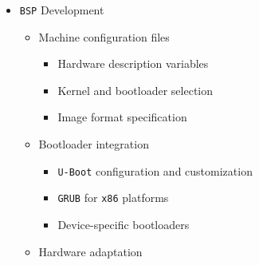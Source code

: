 \documentclass[
]{article}
\providecommand{\tightlist}{%
  \setlength{\itemsep}{0pt}\setlength{\parskip}{0pt}}
\begin{document}
\begin{itemize}
\begin{itemize}
\begin{itemize}
      \begin{itemize}
      \tightlist
      \item
        IMAGE\_FEATURES (debug-tweaks, splash, etc.)
      \item
        DISTRO\_FEATURES (\texttt{systemd}, \texttt{wayland},
        \texttt{x11}, etc.)
      \item
        MACHINE\_FEATURES (\texttt{wifi}, \texttt{bluetooth},
        touchscreen, etc.)
      \item
        Feature dependencies and conflicts
      \end{itemize}
    \item
      Rootfs customization

      \begin{itemize}
      \tightlist
      \item
        Post-processing hooks
      \item
        User and group management
      \item
        Default configuration files
      \item
        \texttt{Systemd} vs SysVinit configuration
      \end{itemize}
    \end{itemize}
  \item
    \texttt{BSP} Development

    \begin{itemize}
    \tightlist
    \item
      Machine configuration files

      \begin{itemize}
      \tightlist
      \item
        Hardware description variables
      \item
        Kernel and bootloader selection
      \item
        Image format specification
      \end{itemize}
    \item
      Bootloader integration

      \begin{itemize}
      \tightlist
      \item
        \texttt{U-Boot} configuration and customization
      \item
        \texttt{GRUB} for \texttt{x86} platforms
      \item
        Device-specific bootloaders
      \end{itemize}
    \item
      Hardware adaptation


\end{itemize}
\end{itemize}
\end{itemize}
\end{document}
